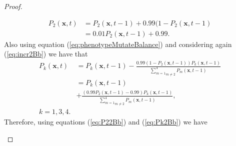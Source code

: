 \documentclass[\main/thesis.tex]{subfiles}
\begin{document}
\begin{proof}
\begin{itemize}
\begin{itemize}
\begin{itemize}
\begin{align*}
                             	                       P_2(\boldsymbol{x}, t) &{=} P_2(\boldsymbol{x}, t{-}1)
                             	                                               {+} 0.99 (1 {-} P_2(\boldsymbol{x}, t{-}1)\\
                             	                                              &{=} 0.01 P_2(\boldsymbol{x}, t{-}1) {+} 0.99.
                             	                       \tag{25}
                             	                       \label{eq:P22Bb}
                             	                     \end{align*}
                             	                     Also using equation (\ref{eq:phenotypeMutateBalance}) and considering 
                             	                     again (\ref{eq:incr2Bb}) we have that
                             	                     \begin{align*}
                             	                       P_k(\boldsymbol{x}, t) &{=} P_k(\boldsymbol{x}, t{-}1) 
                             	                                               {-} \frac{0.99 (1{-}P_2(\boldsymbol{x},t{-}1))
                             		                                                     P_k(\boldsymbol{x}, t{-}1)}
                             	                                                        {\underset{m{\ne}2}{\sum_{m{=}1}^4} 
                             		                                                     P_m(\boldsymbol{x}, t{-}1)}\\
                             	                      &{=} P_k(\boldsymbol{x}, t{-}1) \\ 
                             	                      &{+} \frac{(0.99 P_2(\boldsymbol{x}, t{-}1) 
                             	                                 {-} 0.99)
                             	                    	         P_k(\boldsymbol{x}, t{-}1)}
                             	                                {\underset{m{\ne}2}{\sum_{m{=}1}^4} 
                             	                                 P_m(\boldsymbol{x}, t{-}1)},
                             	                       \tag{26}
                             	                       \label{eq:Pk2Bb} \\
                             	                       k {=} 1, 3, 4.
                             	                     \end{align*}
                             	                     Therefore, using equations (\ref{eq:P22Bb}) and (\ref{eq:Pk2Bb}) we have 

\end{itemize}
\end{itemize}
\end{itemize}
\end{proof}
\end{document}
